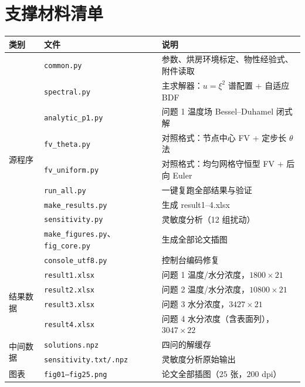 \documentclass[withoutpreface,bwprint]{cumcmthesis}
\begin{document}
\newpage
\appendix

\section{支撑材料清单}

\begin{table}[H]
\centering
\small
\begin{tabular}{@{}lll@{}}
\toprule
类别 & 文件 & 说明 \\
\midrule
\multirow{10}{*}{源程序}
 & \texttt{common.py} & 参数、烘房环境标定、物性经验式、附件读取 \\
 & \texttt{spectral.py} & 主求解器：$u=\xi^2$ 谱配置 + 自适应 BDF \\
 & \texttt{analytic\_p1.py} & 问题 1 温度场 Bessel--Duhamel 闭式解 \\
 & \texttt{fv\_theta.py} & 对照格式：节点中心 FV + 定步长 $\theta$ 法 \\
 & \texttt{fv\_uniform.py} & 对照格式：均匀网格守恒型 FV + 后向 Euler \\
 & \texttt{run\_all.py} & 一键复跑全部结果与验证 \\
 & \texttt{make\_results.py} & 生成 result1--4.xlsx \\
 & \texttt{sensitivity.py} & 灵敏度分析（12 组扰动） \\
 & \texttt{make\_figures.py}、\texttt{fig\_core.py} & 生成全部论文插图 \\
 & \texttt{console\_utf8.py} & 控制台编码修复 \\
\midrule
\multirow{4}{*}{结果数据}
 & \texttt{result1.xlsx} & 问题 1 温度/水分浓度，$1800\times21$ \\
 & \texttt{result2.xlsx} & 问题 2 温度/水分浓度，$10800\times21$ \\
 & \texttt{result3.xlsx} & 问题 3 水分浓度，$3427\times21$ \\
 & \texttt{result4.xlsx} & 问题 4 水分浓度（含表面列），$3047\times22$ \\
\midrule
\multirow{2}{*}{中间数据}
 & \texttt{solutions.npz} & 四问的解缓存 \\
 & \texttt{sensitivity.txt/.npz} & 灵敏度分析原始输出 \\
\midrule
图表 & \texttt{fig01--fig25.png} & 论文全部插图（$25$ 张，$200$ dpi） \\
\bottomrule
\end{tabular}
\end{table}
\end{document}

